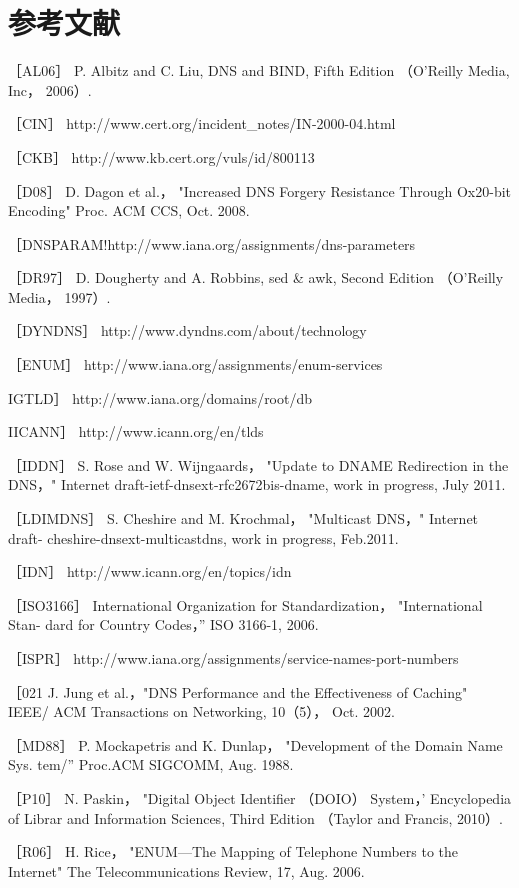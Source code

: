 \section{参考文献}

［AL06］ P. Albitz and C. Liu, DNS and BIND, Fifth Edition （O'Reilly Media, Inc，
2006）.

［CIN］ http://www.cert.org/incident\_notes/IN-2000-04.html

［CKB］ http://www.kb.cert.org/vuls/id/800113

［D08］ D. Dagon et al.， "Increased DNS Forgery Resistance Through Ox20-bit
Encoding" Proc. ACM CCS, Oct. 2008.

［DNSPARAM!http://www.iana.org/assignments/dns-parameters

［DR97］ D. Dougherty and A. Robbins, sed \& awk, Second Edition （O'Reilly Media，
1997）.

［DYNDNS］ http://www.dyndns.com/about/technology

［ENUM］ http://www.iana.org/assignments/enum-services

IGTLD］ http://www.iana.org/domains/root/db

IICANN］ http://www.icann.org/en/tlds

［IDDN］ S. Rose and W. Wijngaards， "Update to DNAME Redirection in the
DNS，" Internet draft-ietf-dnsext-rfc2672bis-dname, work in progress, July 2011.

［LDIMDNS］ S. Cheshire and M. Krochmal， "Multicast DNS，" Internet draft-
cheshire-dnsext-multicastdns, work in progress, Feb.2011.

［IDN］ http://www.icann.org/en/topics/idn

［ISO3166］ International Organization for Standardization， "International Stan-
dard for Country Codes，” ISO 3166-1, 2006.

［ISPR］ http://www.iana.org/assignments/service-names-port-numbers

［021 J. Jung et al.，"DNS Performance and the Effectiveness of Caching" IEEE/
ACM Transactions on Networking, 10（5）， Oct. 2002.

［MD88］ P. Mockapetris and K. Dunlap， "Development of the Domain Name Sys.
tem/” Proc.ACM SIGCOMM, Aug. 1988.

［P10］ N. Paskin， "Digital Object Identifier （DOIO） System，' Encyclopedia of Librar
and Information Sciences, Third Edition （Taylor and Francis, 2010）.

［R06］ H. Rice， "ENUM—The Mapping of Telephone Numbers to the Internet"
The Telecommunications Review, 17, Aug. 2006.

